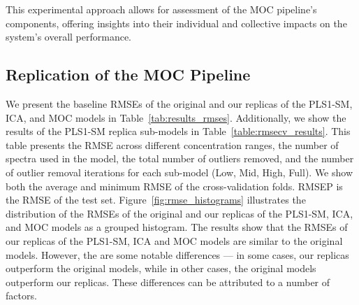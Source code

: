 This experimental approach allows for assessment of the MOC pipeline's components, offering insights into their individual and collective impacts on the system's overall performance.

\subsection{Replication of the MOC Pipeline}\label{sec:replica_moc}
We present the baseline RMSEs of the original and our replicas of the PLS1-SM, ICA, and MOC models in Table~\ref{tab:results_rmses}.
Additionally, we show the results of the PLS1-SM replica sub-models in Table~\ref{table:rmsecv_results}. This table presents the RMSE across different concentration ranges, the number of spectra used in the model, the total number of outliers removed, and the number of outlier removal iterations for each sub-model (Low, Mid, High, Full). We show both the average and minimum RMSE of the cross-validation folds. RMSEP is the RMSE of the test set.
Figure~\ref{fig:rmse_histograms} illustrates the distribution of the RMSEs of the original and our replicas of the PLS1-SM, ICA, and MOC models as a grouped histogram.
The results show that the RMSEs of our replicas of the PLS1-SM, ICA and MOC models are similar to the original models.
However, the are some notable differences --- in some cases, our replicas outperform the original models, while in other cases, the original models outperform our replicas.
These differences can be attributed to a number of factors.

